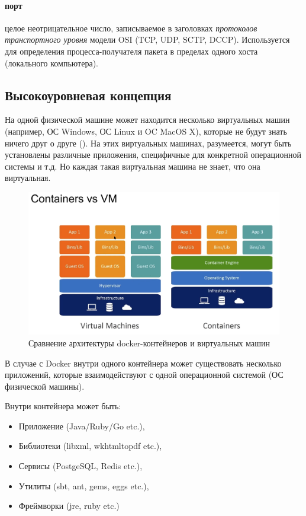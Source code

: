 \documentclass[%
	11pt,
	a4paper,
	utf8,
		]{article}
\begin{document}
\paragraph{{порт}} целое неотрицательное число, записываемое в заголовках \emph{протоколов транспортного уровня} модели OSI (TCP, UDP, SCTP, DCCP). Используется для определения процесса-получателя пакета в пределах одного хоста (локального компьютера).

\subsection{Высокоуровневая концепция}

На одной физической машине  может находится несколько виртуальных машин (например, ОС Windows, ОС Linux и OC MacOS X), которые не будут знать ничего друг о друге (). На этих виртуальных машинах, разумеется, могут быть установлены различные приложения, специфичные для конкретной операционной системы и т.д. Но каждая такая виртуальная машина не знает, что она виртуальная.

\begin{figure}[h]
	\centering
	\includegraphics[scale=0.45]{figures/container_vs_VM.png}
	\caption{ Сравнение архитектуры docker-контейнеров и виртуальных машин }\label{fig:containervsvm}
\end{figure}

В случае с Docker внутри одного контейнера может существовать несколько приложений, которые взаимодействуют с одной операционной системой (ОС физической машины).

Внутри контейнера может быть:
\begin{itemize}
	\item Приложение (Java/Ruby/Go etc.),
	
	\item Библиотеки (libxml, wkhtmltopdf etc.),
	
	\item Сервисы (PostgeSQL, Redis etc.),
	
	\item Утилиты (sbt, ant, gems, eggs etc.),
	
	\item Фреймворки (jre, ruby etc.)
\end{itemize}
\end{document}

